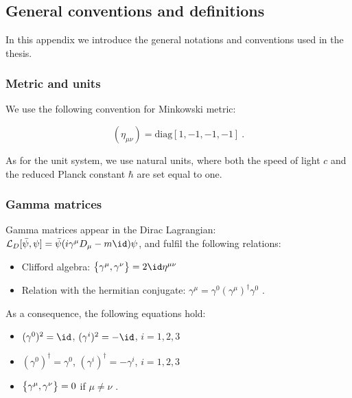 \appendix

\chapter{}

\section{General conventions and definitions}

In this appendix we introduce the general notations and conventions used in the thesis. 

\subsection{Metric and units}

We use the following convention for Minkowski metric:

\begin{equation}
(\eta_{\mu\nu}) = \mathrm{diag}[1,-1,-1,-1] \: .
\label{metric}
\end{equation}

As for the unit system, we use natural units, where both the speed of light $c$ and the reduced Planck constant $\hbar$ are set equal to one.

\subsection{Gamma matrices}
\label{gamma_matrices}

Gamma matrices appear in the Dirac Lagrangian: $\Lag_D [\bar \psi, \psi] = \bar \psi (i \gamma^{\mu} D_{\mu} -m \id) \psi$, and fulfil the following relations:

\begin{itemize}
\item Clifford algebra: $\qty \big{\gamma^{\mu}, \gamma^{\nu}} = 2 \id \eta^{\mu \nu}$
\item Relation with the hermitian conjugate: $\gamma^{\mu} = \gamma^0 (\gamma^{\mu})^{\dagger} \gamma^0$ \: .
\end{itemize}
%
As a consequence, the following equations hold:
\begin{itemize}
\item $(\gamma^0)^2 = \id$, $(\gamma^i)^2 = - \id$, $i= 1,2,3$
\item $(\gamma^0)^{\dagger} = \gamma^0$, $(\gamma^i)^{\dagger} = -\gamma^i$, $i= 1,2,3$
\item $\qty \big{\gamma^{\mu}, \gamma^{\nu}} = 0$ if $\mu \neq \nu$ \: .
\end{itemize}

